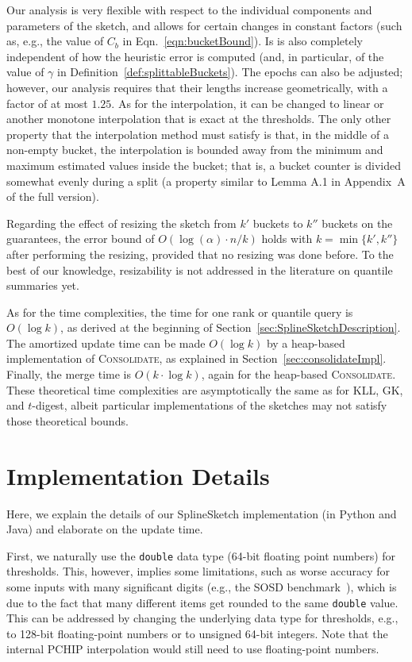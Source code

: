 \documentclass[acmsmall]{acmart}
\newcommand{\consolidate}{\textsc{Consolidate}\xspace}
\theoremstyle{remark}
\begin{document}
Our analysis is very flexible with respect to the individual components and parameters of the sketch,
and allows for certain changes in constant factors (such as, e.g., the value of $C_b$ in Eqn.~\ref{eqn:bucketBound}).
Is is also completely independent of how the heuristic error is computed (and, in particular, of the value of $\gamma$ in Definition~\ref{def:splittableBuckets}).
The epochs can also be adjusted; however, our analysis requires that their lengths increase geometrically, with a factor of at most $1.25$.
As for the interpolation, it can be changed to linear or another monotone interpolation that is exact at the thresholds.
The only other property that the interpolation method must satisfy is that, in the middle of a non-empty bucket, the interpolation is bounded away from the minimum and maximum estimated values inside the bucket;
that is, a bucket counter is divided somewhat evenly during a split (a property similar to Lemma A.1 in Appendix~A of the full version).

Regarding the effect of resizing the sketch from $k'$ buckets to $k''$ buckets on the guarantees, 
the error bound of $O(\log (\alpha) \cdot n / k)$ holds with $k=\min\{k', k''\}$ after performing the resizing,
provided that no resizing was done before.
To the best of our knowledge, resizability is not addressed in the literature on quantile summaries yet.

As for the time complexities, the time for one rank or quantile query is $O(\log k)$, as derived at the beginning of Section~\ref{sec:SplineSketchDescription}.
The amortized update time can be made $O(\log k)$ by a heap-based implementation of \consolidate, as explained in Section~\ref{sec:consolidateImpl}.
Finally, the merge time is $O(k\cdot \log k)$, again for the heap-based \consolidate.
These theoretical time complexities are asymptotically the same as for KLL, GK, and $t$-digest,
albeit particular implementations of the sketches may not satisfy those theoretical bounds.



\section{Implementation Details}
\label{sec:implementation}

Here, we explain the details of our SplineSketch implementation (in Python and Java) and elaborate
on the update time. %

First, we naturally use the \texttt{double} data type (64-bit floating point numbers) for thresholds. This, however, 
implies some limitations, such as worse accuracy for some inputs with many significant digits (e.g., the SOSD benchmark~\cite{sosd,MarcusKRSMK0K20sosd}), which is due to the fact that many different items get rounded to the 
same \texttt{double} value. This can be addressed by changing the underlying data type for thresholds, e.g., to 128-bit floating-point numbers or to unsigned 64-bit integers.
Note that the internal PCHIP interpolation would still need to use floating-point numbers.
\end{document}
